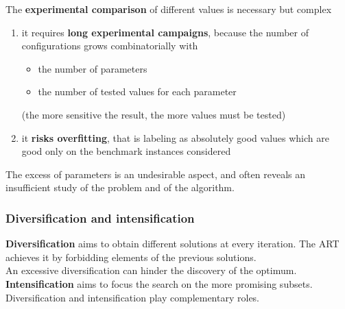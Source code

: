 \documentclass[11pt]{article}
\begin{document}
	The \textbf{experimental comparison} of different values is necessary but complex
	\begin{enumerate}
		\item it requires \textbf{long experimental campaigns}, because the number of configurations grows combinatorially with
		\begin{itemize}
			\item the number of parameters
			\item the number of tested values for each parameter
		\end{itemize}
		(the more sensitive the result, the more values must be tested)\\
		
		\item it \textbf{risks overfitting}, that is labeling as absolutely good values which are good only on the benchmark instances considered \\
	\end{enumerate}
	
	The excess of parameters is an undesirable aspect, and often reveals an insufficient study of the problem and of the algorithm.\\
	
	\newpage
	
	\subsubsection{Diversification and intensification}
	
	\textbf{Diversification} aims to obtain different solutions at every iteration. The ART achieves it by forbidding elements of the previous solutions.\\
	An excessive diversification can hinder the discovery of the optimum.\\
	
	\textbf{Intensification} aims to focus the search on the more promising subsets.\\
	
	Diversification and intensification play complementary roles.\\
	
\end{document}
